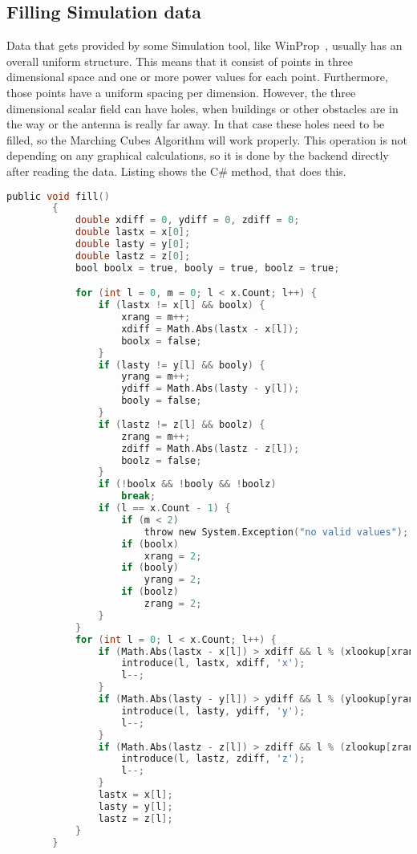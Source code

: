 \subsection{Filling Simulation data}
Data that gets provided by some Simulation tool, like WinProp~\cite{WinProp}, usually has an overall uniform structure. This means that it consist of points in three dimensional space and one or more power values for each point. Furthermore, those points have a uniform spacing per dimension. However, the three dimensional scalar field can have holes, when buildings or other obstacles are in the way or the antenna is really far away. In that case these holes need to be filled, so the Marching Cubes Algorithm will work properly. This operation is not depending on any graphical calculations, so it is done by the backend directly after reading the data. Listing shows the C\# method, that does this. 
\lstset{
caption=Building Loader,
label=list:Fill}
\begin{lstlisting}[language=C, float=bph]
public void fill()
        {
            double xdiff = 0, ydiff = 0, zdiff = 0;
            double lastx = x[0];
            double lasty = y[0];
            double lastz = z[0];
            bool boolx = true, booly = true, boolz = true;

            for (int l = 0, m = 0; l < x.Count; l++) {
                if (lastx != x[l] && boolx) {
                    xrang = m++;
                    xdiff = Math.Abs(lastx - x[l]);
                    boolx = false;
                }
                if (lasty != y[l] && booly) {
                    yrang = m++;
                    ydiff = Math.Abs(lasty - y[l]);
                    booly = false;
                }
                if (lastz != z[l] && boolz) {
                    zrang = m++;
                    zdiff = Math.Abs(lastz - z[l]);
                    boolz = false;
                }
                if (!boolx && !booly && !boolz)
                    break;
                if (l == x.Count - 1) {
                    if (m < 2)
                        throw new System.Exception("no valid values");
                    if (boolx)
                        xrang = 2;
                    if (booly)
                        yrang = 2;
                    if (boolz)
                        zrang = 2;
                }
            }
            for (int l = 0; l < x.Count; l++) {
                if (Math.Abs(lastx - x[l]) > xdiff && l % (xlookup[xrang, yrang] * dim[0]) != 0)  {
                    introduce(l, lastx, xdiff, 'x');
                    l--;
                }
                if (Math.Abs(lasty - y[l]) > ydiff && l % (ylookup[yrang, zrang] * dim[1]) != 0) {
                    introduce(l, lasty, ydiff, 'y');
                    l--;
                }
                if (Math.Abs(lastz - z[l]) > zdiff && l % (zlookup[zrang, xrang] * dim[2]) != 0) {
                    introduce(l, lastz, zdiff, 'z');
                    l--;
                }
                lastx = x[l];
                lasty = y[l];
                lastz = z[l];
            }
        }
\end{lstlisting}

